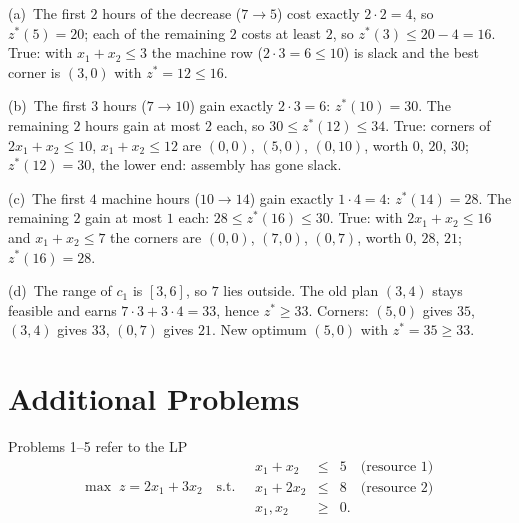 \begin{solutions}
        (a)~The first $2$ hours of the decrease ($7\to 5$) cost exactly
        $2\cdot2=4$, so $z^{*}(5)=20$; each of the remaining $2$ costs at
        least $2$, so $z^{*}(3)\le 20-4=16$. True: with
        $x_{1}+x_{2}\le 3$ the machine row ($2\cdot3=6\le 10$) is slack and
        the best corner is $(3,0)$ with $z^{*}=12\le 16$.

        (b)~The first $3$ hours ($7\to 10$) gain exactly $2\cdot3=6$:
        $z^{*}(10)=30$. The remaining $2$ hours gain at most $2$ each, so
        $30\le z^{*}(12)\le 34$. True: corners of $2x_{1}+x_{2}\le 10$,
        $x_{1}+x_{2}\le 12$ are $(0,0)$, $(5,0)$, $(0,10)$, worth $0$,
        $20$, $30$; $z^{*}(12)=30$, the lower end: assembly has gone slack.

        (c)~The first $4$ machine hours ($10\to 14$) gain exactly
        $1\cdot4=4$: $z^{*}(14)=28$. The remaining $2$ gain at most $1$
        each: $28\le z^{*}(16)\le 30$. True: with $2x_{1}+x_{2}\le 16$ and
        $x_{1}+x_{2}\le 7$ the corners are $(0,0)$, $(7,0)$, $(0,7)$, worth
        $0$, $28$, $21$; $z^{*}(16)=28$.

        (d)~The range of $c_{1}$ is $[3,6]$, so $7$ lies outside. The old
        plan $(3,4)$ stays feasible and earns $7\cdot3+3\cdot4=33$, hence
        $z^{*}\ge 33$. Corners: $(5,0)$ gives $35$, $(3,4)$ gives $33$,
        $(0,7)$ gives $21$. New optimum $(5,0)$ with $z^{*}=35\ge 33$.
\end{solutions}

\section{Additional Problems}

Problems 1--5 refer to the LP
\[
  \max\; z=2x_{1}+3x_{2}
  \quad\text{s.t.}\quad
  \begin{array}{rcl}
    x_{1}+x_{2}  &\le& 5 \quad\text{(resource 1)}\\
    x_{1}+2x_{2} &\le& 8 \quad\text{(resource 2)}\\
    x_{1},x_{2}  &\ge& 0 .
  \end{array}
\]

